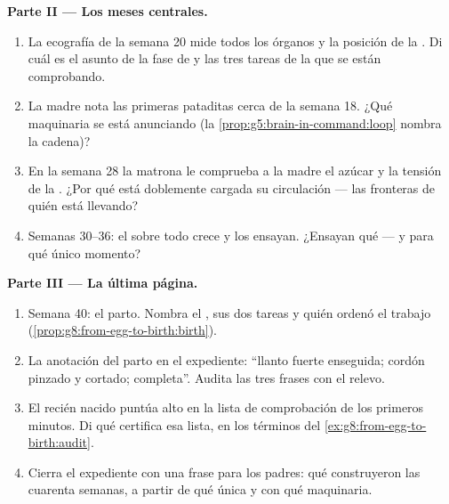 \begin{problem}
\medskip\noindent\textbf{Parte II --- Los meses centrales.}
\begin{enumerate}[resume]
  \item La ecografía de la semana 20 mide todos los órganos y la
        posición de la . Di cuál es el asunto de la fase de
         y las tres tareas de la  que se están comprobando.
  \item La madre nota las primeras pataditas cerca de la semana 18.
        ¿Qué maquinaria se está anunciando (la
        \cref{prop:g5:brain-in-command:loop} nombra la cadena)?
  \item En la semana 28 la matrona le comprueba a la madre el azúcar y
        la tensión de la . ¿Por qué está doblemente cargada su
        circulación --- las fronteras de quién está llevando?
  \item Semanas 30--36: el  sobre todo crece y los 
        ensayan. ¿Ensayan qué --- y para qué único momento?
\end{enumerate}

\medskip\noindent\textbf{Parte III --- La última página.}
\begin{enumerate}[resume]
  \item Semana 40: el parto. Nombra el , sus dos tareas y quién
        ordenó el trabajo (\cref{prop:g8:from-egg-to-birth:birth}).
  \item La anotación del parto en el expediente: ``llanto fuerte
        enseguida; cordón pinzado y cortado;  completa''.
        Audita las tres frases con el relevo.
  \item El recién nacido puntúa alto en la lista de comprobación de los
        primeros minutos. Di qué certifica esa lista, en los términos
        del \cref{ex:g8:from-egg-to-birth:audit}.
  \item Cierra el expediente con una frase para los padres: qué
        construyeron las cuarenta semanas, a partir de qué única 
        y con qué maquinaria.
\end{enumerate}
\end{problem}
